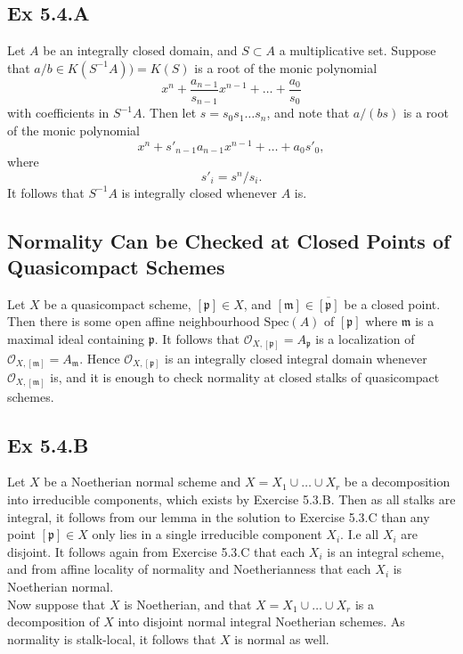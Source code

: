 \documentclass{article}
\theoremstyle{definition}
\newcommand{\oo}{\mathcal{O}}
\newcommand{\Spec}{\text{Spec}}
\begin{document}
\subsection*{Ex 5.4.A}

Let $A$ be an integrally closed domain, and $S \subset A$ a multiplicative set.
Suppose that $a/b \in K(S^{-1}A)) = K(S)$ is a root of the monic polynomial
\[
	x^n + \frac{a_{n-1}}{s_{n-1}} x^{n-1} + \ldots + \frac{a_0}{s_0}
\]
with coefficients in $S^{-1}A$. Then let $s = s_0s_1\ldots s_n$,
and note that $a/(bs)$ is a root of the monic polynomial
\[
	x^n + s'_{n-1} a_{n-1} x^{n-1} + \ldots + a_0s'_0,
\]
where
\[
	s'_i
	=
	s^n/s_i.
\]
It follows that $S^{-1}A$ is integrally closed whenever $A$ is.


\subsection*{Normality Can be Checked at Closed Points of Quasicompact Schemes}

Let $X$ be a quasicompact scheme, $[\mathfrak{p}] \in X$, and $[\mathfrak{m}]
	\in \overline{[\mathfrak{p}]}$ be a closed point. Then there is some open
affine neighbourhood $\Spec(A)$ of $[\mathfrak{p}]$ where $\mathfrak{m}$ is a
maximal ideal containing $\mathfrak{p}$. It follows that $\oo_{X,
		[\mathfrak{p}]} = A_{\mathfrak{p}}$ is a localization of $\oo_{X,
		[\mathfrak{m}]} = A_{\mathfrak{m}}$. Hence $\oo_{X, [\mathfrak{p}]}$ is an
integrally closed integral domain whenever $\oo_{X, [\mathfrak{m}]}$ is, and it
is enough to check normality at closed stalks of quasicompact schemes.


\subsection*{Ex 5.4.B}

Let $X$ be a Noetherian normal scheme and $X = X_1 \cup \ldots \cup X_r$ be a
decomposition into irreducible components, which exists by Exercise 5.3.B. Then
as all stalks are integral, it follows from our lemma in the solution to
Exercise 5.3.C than any point $[\mathfrak{p}] \in X$ only lies in a single
irreducible component $X_i$. I.e all $X_i$ are disjoint. It follows again from
Exercise 5.3.C that each $X_i$ is an integral scheme, and from affine locality
of normality and Noetherianness that each $X_i$ is Noetherian normal. \\

Now suppose that $X$ is Noetherian, and that $X = X_1 \cup \ldots \cup X_r$ is
a decomposition of $X$ into disjoint normal integral Noetherian schemes. As
normality is stalk-local, it follows that $X$ is normal as well.
\end{document}
